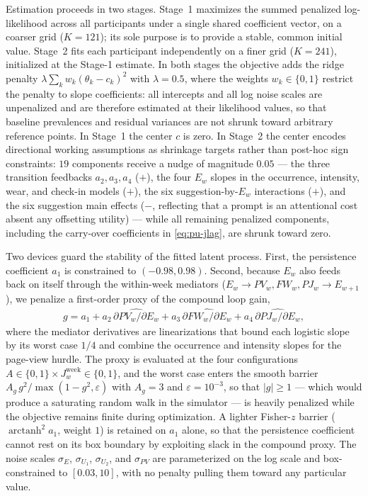 Estimation proceeds in two stages. Stage~1 maximizes the summed penalized
log-likelihood across all participants under a single shared coefficient
vector, on a coarser grid ($K = 121$); its sole purpose is to provide a
stable, common initial value. Stage~2 fits each participant independently on a
finer grid ($K = 241$), initialized at the Stage-1 estimate. In both stages
the objective adds the ridge penalty
$\lambda \sum_k w_k (\theta_k - c_k)^2$ with $\lambda = 0.5$, where the weights
$w_k \in \{0, 1\}$ restrict the penalty to slope coefficients: all intercepts
and all log noise scales are unpenalized and are therefore estimated at their
likelihood values, so that baseline prevalences and residual variances are not
shrunk toward arbitrary reference points. In Stage~1 the center $c$ is zero.
In Stage~2 the center encodes directional working assumptions as shrinkage
targets rather than post-hoc sign constraints: $19$ components receive a nudge
of magnitude $0.05$ --- the three transition feedbacks $a_2, a_3, a_4$ ($+$),
the four $E_w$ slopes in the occurrence, intensity, wear, and check-in models
($+$), the six suggestion-by-$E_w$ interactions ($+$), and the six suggestion
main effects ($-$, reflecting that a prompt is an attentional cost absent any
offsetting utility) --- while all remaining penalized components, including the
carry-over coefficients in \eqref{eq:pu-jlag}, are shrunk toward zero.

Two devices guard the stability of the fitted latent process. First, the
persistence coefficient $a_1$ is constrained to $(-0.98, 0.98)$. Second,
because $E_w$ also feeds back on itself through the within-week mediators
($E_w \to PV_w, FW_w, PJ_w \to E_{w+1}$), we penalize a first-order proxy of
the compound loop gain,
\begin{align}
g
=
a_1
+ a_2\, \widehat{\partial PV_w / \partial E_w}
+ a_3\, \widehat{\partial FW_w / \partial E_w}
+ a_4\, \widehat{\partial PJ_w / \partial E_w},
\label{eq:pu-loop-gain}
\end{align}
where the mediator derivatives are linearizations that bound each logistic
slope by its worst case $1/4$ and combine the occurrence and intensity slopes
for the page-view hurdle. The proxy is evaluated at the four configurations
$A \in \{0, 1\} \times J_{w}^{\mathrm{week}} \in \{0, 1\}$, and the worst
case enters the smooth barrier $A_g\, g^2 / \max(1 - g^2, \varepsilon)$ with
$A_g = 3$ and $\varepsilon = 10^{-3}$, so that $\lvert g \rvert \geq 1$ ---
which would produce a saturating random walk in the simulator --- is heavily
penalized while the objective remains finite during optimization. A lighter
Fisher-$z$ barrier ($\operatorname{arctanh}^2 a_1$, weight $1$) is retained on
$a_1$ alone, so that the persistence coefficient cannot rest on its box
boundary by exploiting slack in the compound proxy. The noise scales
$\sigma_E$, $\sigma_{U_1}$, $\sigma_{U_2}$, and $\sigma_{PV}$ are parameterized
on the log scale and box-constrained to $[0.03, 10]$, with no penalty pulling
them toward any particular value.
